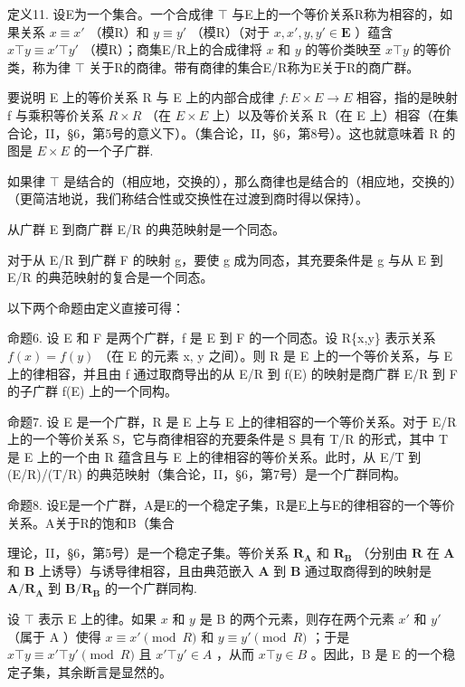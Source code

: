 定义11. 设E为一个集合。一个合成律 \(\top\) 与E上的一个等价关系R称为相容的，如果关系 \(x \equiv x'\) （模R）和 \(y \equiv y'\) （模R）（对于 \(x, x', y, y' \in \mathbf{E}\) ）蕴含 \(x \top y \equiv x' \top y'\) （模R）；商集E/R上的合成律将 \(x\) 和 \(y\) 的等价类映至 \(x \top y\) 的等价类，称为律 \(\top\) 关于R的商律。带有商律的集合E/R称为E关于R的商广群。

要说明 E 上的等价关系 R 与 E 上的内部合成律 \(f: E \times E \to E\) 相容，指的是映射 f 与乘积等价关系 \(R \times R\) （在 \(E \times E\) 上）以及等价关系 R（在 E 上）相容（在集合论，II，§6，第5号的意义下）。（集合论，II，§6，第8号）。这也就意味着 R 的图是 \(E \times E\) 的一个子广群.

如果律 \(\top\) 是结合的（相应地，交换的），那么商律也是结合的（相应地，交换的）（更简洁地说，我们称结合性或交换性在过渡到商时得以保持）。

从广群 E 到商广群 E/R 的典范映射是一个同态。

对于从 E/R 到广群 F 的映射 g，要使 g 成为同态，其充要条件是 g 与从 E 到 E/R 的典范映射的复合是一个同态。

以下两个命题由定义直接可得：

命题6. 设 E 和 F 是两个广群，f 是 E 到 F 的一个同态。设 R\{x,y\} 表示关系 \(f(x)=f(y)\) （在 E 的元素 x, y 之间）。则 R 是 E 上的一个等价关系，与 E 上的律相容，并且由 f 通过取商导出的从 E/R 到 f(E) 的映射是商广群 E/R 到 F 的子广群 f(E) 上的一个同构。

命题7. 设 E 是一个广群，R 是 E 上与 E 上的律相容的一个等价关系。对于 E/R 上的一个等价关系 S，它与商律相容的充要条件是 S 具有 T/R 的形式，其中 T 是 E 上的一个由 R 蕴含且与 E 上的律相容的等价关系。此时，从 E/T 到 (E/R)/(T/R) 的典范映射（集合论，II，§6，第7号）是一个广群同构。

命题8. 设E是一个广群，A是E的一个稳定子集，R是E上与E的律相容的一个等价关系。A关于R的饱和B（集合

理论，II，§6，第5号）是一个稳定子集。等价关系 \(\mathbf{R}_{\mathbf{A}}\) 和 \(\mathbf{R}_{\mathbf{B}}\) （分别由 \(\mathbf{R}\) 在 \(\mathbf{A}\) 和 \(\mathbf{B}\) 上诱导）与诱导律相容，且由典范嵌入 \(\mathbf{A}\) 到 \(\mathbf{B}\) 通过取商得到的映射是 \(\mathbf{A} / \mathbf{R}_{\mathbf{A}}\) 到 \(\mathbf{B} / \mathbf{R}_{\mathbf{B}}\) 的一个广群同构.

设 \(\top\) 表示 E 上的律。如果 \(x\) 和 \(y\) 是 B 的两个元素，则存在两个元素 \(x'\) 和 \(y'\) （属于 A ）使得 \(x \equiv x' \pmod{R}\) 和 \(y \equiv y' \pmod{R}\) ；于是 \(x \top y \equiv x' \top y' \pmod{R}\) 且 \(x' \top y' \in A\) ，从而 \(x \top y \in B\) 。因此，B 是 E 的一个稳定子集，其余断言是显然的。

